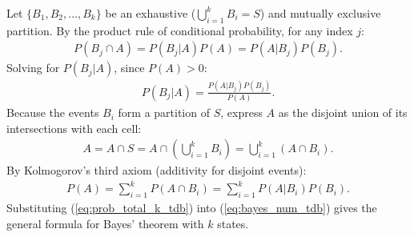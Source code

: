 \begin{solproblema}[prob:a7e87e4]
	Let $\{B_1, B_2, \dots, B_k\}$ be an exhaustive ($\bigcup_{i=1}^k B_i = S$) and mutually exclusive partition. By the product rule of conditional probability, for any index $j$:
	\begin{align}
		P(B_j \cap A) = P(B_j | A) P(A) = P(A | B_j) P(B_j).
	\end{align}
	Solving for $P(B_j|A)$, since $P(A)>0$:
	\begin{align}
		P(B_j | A) = \frac{P(A | B_j) P(B_j)}{P(A)}. \label{eq:bayes_num_tdb}
	\end{align}
	Because the events $B_i$ form a partition of $S$, express $A$ as the disjoint union of its intersections with each cell:
	\begin{align}
		A = A \cap S = A \cap \left( \bigcup_{i=1}^k B_i \right) = \bigcup_{i=1}^k (A \cap B_i).
	\end{align}
	By Kolmogorov's third axiom (additivity for disjoint events):
	\begin{align}
		P(A) = \sum_{i=1}^k P(A \cap B_i) = \sum_{i=1}^k P(A | B_i) P(B_i). \label{eq:prob_total_k_tdb}
	\end{align}
	Substituting (\ref{eq:prob_total_k_tdb}) into (\ref{eq:bayes_num_tdb}) gives the general formula for Bayes' theorem with $k$ states.
\end{solproblema}

